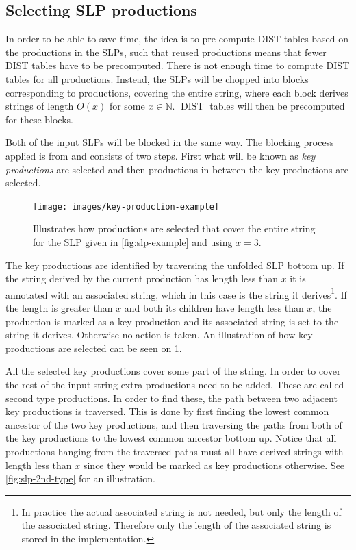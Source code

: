\documentclass[twoside,11pt,openright]{report}
\newcommand{\DIST}{\operatorname{DIST}}
\begin{document}
\subsection{Selecting SLP productions}
\label{sec:algorithm:select-productions}
In order to be able to save time, the idea is to pre-compute DIST tables based on the productions in the SLPs, such that reused productions means that fewer DIST tables have to be precomputed. There is not enough time to compute DIST tables for all productions. Instead, the SLPs will be chopped into blocks corresponding to productions, covering the entire string, where each block derives strings of length $O(x)$ for some $x \in \mathbb{N}$. $\DIST$ tables will then be precomputed for these blocks.

Both of the input SLPs will be blocked in the same way. The blocking process applied is from \cite[Section 4]{DBLP:journals/corr/abs-1004-1194} and consists of two steps. First what will be known as \textit{key productions} are selected and then productions in between the key productions are selected.

\begin{figure}[!htb]
  \centering
  \texttt{[image: images/key-production-example]}
  \caption{Illustrates how productions are selected that cover the entire string for the SLP given in \cref{fig:slp-example} and using $x = 3$.}
  \label{fig:key-production-selection}
\end{figure}

The key productions are identified by traversing the unfolded SLP bottom up. If the string derived by the current production has length less than $x$ it is annotated with an associated string, which in this case is the string it derives\footnote{In practice the actual associated string is not needed, but only the length of the associated string. Therefore only the length of the associated string is stored in the implementation.}. If the length is greater than $x$ and both its children have length less than $x$, the production is marked as a key production and its associated string is set to the string it derives. Otherwise no action is taken. An illustration of how key productions are selected can be seen on \cref{fig:key-production-selection}.

All the selected key productions cover some part of the string. In order to cover the rest of the input string extra productions need to be added. These are called second type productions. In order to find these, the path between two adjacent key productions is traversed. This is done by first finding the lowest common ancestor of the two key productions, and then traversing the paths from both of the key productions to the lowest common ancestor bottom up. Notice that all productions hanging from the traversed paths must all have derived strings with length less than $x$ since they would be marked as key productions otherwise. See \cref{fig:slp-2nd-type} for an illustration.
\end{document}
